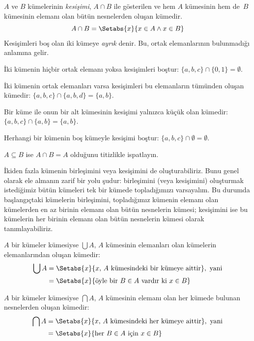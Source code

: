 \documentclass[../../../include/open-logic-section]{subfiles}
\begin{document}
\begin{defn}[Kesişim]
$A$ ve $B$ kümelerinin \emph{kesişimi}, $A \cap B$ ile gösterilen ve hem
$A$ kümesinin hem de~$B$ kümesinin elemanı olan bütün nesnelerden oluşan
kümedir.
\[
A \cap B = \Setabs{x}{x \in A \land x \in B}
\]
Kesişimleri boş olan iki kümeye \emph{ayrık} denir. Bu, ortak elemanlarının
bulunmadığı anlamına gelir.
\end{defn}

\begin{ex}
İki kümenin hiçbir ortak elemanı yoksa kesişimleri boştur:
$\{ a, b, c\} \cap \{ 0, 1\} = \emptyset$.

İki kümenin ortak elemanları varsa kesişimleri bu elemanların tümünden oluşan
kümedir:
$\{a, b, c \} \cap \{a, b, d \} = \{a, b\}$.

Bir küme ile onun bir alt kümesinin kesişimi yalnızca küçük olan kümedir:
$\{a, b, c\} \cap \{a, b\} = \{a, b\}$.

Herhangi bir kümenin boş kümeyle kesişimi boştur:
$\{a, b, c \} \cap \emptyset = \emptyset$.
\end{ex}

\begin{prob}
$A \subseteq B$ ise $A \cap B = A$ olduğunu titizlikle ispatlayın.
\end{prob}

\begin{explain}
İkiden fazla kümenin birleşimini veya kesişimini de oluşturabiliriz. Bunu genel
olarak ele almanın zarif bir yolu şudur: birleşimini (veya kesişimini)
oluşturmak istediğimiz bütün kümeleri tek bir kümede topladığımızı varsayalım.
Bu durumda başlangıçtaki kümelerin birleşimini, topladığımız kümenin elemanı
olan kümelerden en az birinin elemanı olan bütün nesnelerin kümesi; kesişimini
ise bu kümelerin her birinin elemanı olan bütün nesnelerin kümesi olarak
tanımlayabiliriz.
\end{explain}

\begin{defn}
$A$ bir kümeler kümesiyse $\bigcup A$, $A$ kümesinin elemanları olan
kümelerin elemanlarından oluşan kümedir:
\begin{align*}
\bigcup A & = \Setabs{x}{x \text{, } A\text{ kümesindeki bir kümeye aittir}},
\text{ yani}\\
& = \Setabs{x}{\text{öyle bir } B \in A
  \text{ vardır ki } x \in B}
\end{align*}
\end{defn}

\begin{defn}
$A$ bir kümeler kümesiyse $\bigcap A$, $A$ kümesinin elemanı olan her kümede
bulunan nesnelerden oluşan kümedir:
\begin{align*}
\bigcap A & = \Setabs{x}{x \text{, } A\text{ kümesindeki her kümeye aittir}},
\text{ yani}\\
 & = \Setabs{x}{\text{her } B \in A \text{ için } x \in B}
\end{align*}
\end{defn}
\end{document}
